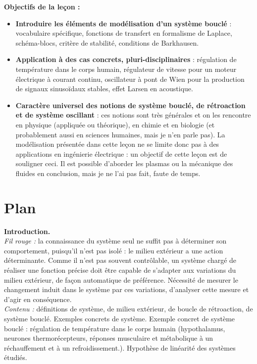 \documentclass[11pt,a4paper]{report}
\begin{document}
\textbf{Objectifs de la leçon :}
\begin{itemize}
 	\item \textbf{Introduire les éléments de modélisation d'un système bouclé} : vocabulaire spécifique, fonctions de transfert en formalisme de Laplace, schéma-blocs, critère de stabilité, conditions de Barkhausen.
 	\item \textbf{Application à des cas concrets, pluri-disciplinaires} : régulation de température dans le corps humain, régulateur de vitesse pour un moteur électrique à courant continu, oscillateur à pont de Wien pour la production de signaux sinusoïdaux stables, effet Larsen en acoustique.
 	\item \textbf{Caractère universel des notions de système bouclé, de rétroaction et de système oscillant} : ces notions sont très générales et on les rencontre en physique (appliquée ou théorique), en chimie et en biologie (et probablement aussi en sciences humaines, mais je n'en parle pas). La modélisation présentée dans cette leçon ne se limite donc pas à des applications en ingénierie électrique : un objectif de cette leçon est de souligner ceci. Il est possible d'aborder les plasmas ou la mécanique des fluides en conclusion, mais je ne l'ai pas fait, faute de temps.
\end{itemize}

\newpage
\section*{Plan}

\textbf{Introduction.}\\
\textit{Fil rouge :} la connaissance du système seul ne suffit pas à déterminer son comportement, puisqu'il n'est pas isolé : le milieu extérieur a une action déterminante. Comme il n'est pas souvent contrôlable, un système chargé de réaliser une fonction précise doit être capable de s'adapter aux variations du milieu extérieur, de façon automatique de préférence. Nécessité de mesurer le changement induit dans le système par ces variations, d'analyser cette mesure et d'agir en conséquence.\\
\textit{Contenu :} définitions de système, de milieu extérieur, de boucle de rétroaction, de système bouclé. Exemples concrets de système. Exemple concret de système bouclé : régulation de température dans le corps humain (hypothalamus, neurones thermorécepteurs, réponses musculaire et métabolique à un réchauffement et à un refroidissement.). Hypothèse de linéarité des systèmes étudiés. 
\end{document}
